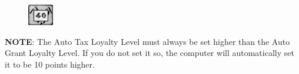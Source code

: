 \begin{figure}
    \vspace{-20pt}
    \begin{center}
        \includegraphics[width=0.1\textwidth]{Tautogrant40}
    \end{center}
    \vspace{-20pt}
\end{figure}

\textbf{NOTE}: The Auto Tax Loyalty Level must always be set higher than the Auto Grant Loyalty Level. If you do not set it so, the computer will automatically set it to be 10 points higher.